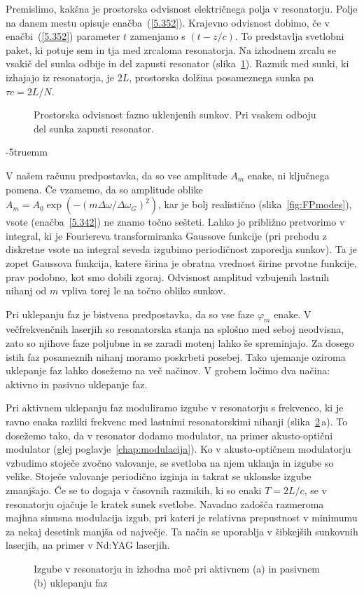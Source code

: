 Premislimo, kakšna je prostorska odvisnost električnega polja v
resonatorju. Polje na danem mestu opisuje enačba~(\ref{5.352}). Krajevno 
odvisnost dobimo, če v enačbi~(\ref{5.352}) parameter $t$ zamenjamo s $(t-z/c)$. To
predstavlja svetlobni paket, ki potuje sem in tja med zrcaloma
resonatorja. Na izhodnem zrcalu se vsakič del sunka odbije in del zapusti
resonator (slika~\ref{fig.5.11}). Razmik med sunki, ki izhajajo iz
resonatorja, je $2L$, prostorska dolžina posameznega sunka pa $\tau c=2L/N$.
\begin{figure}[h]
\centering
\def\svgwidth{120truemm} 

\caption{Prostorska odvisnost fazno uklenjenih sunkov. Pri vsakem odboju del
sunka zapusti resonator.}
\label{fig.5.11}
\end{figure}
\vglue-5truemm
\begin{remark}
V našem računu predpostavka, da so vse amplitude $A_{m}$ enake, ni ključnega 
pomena. Če vzamemo, da so amplitude oblike 
$A_{m}=A_{0}\exp (-(m\Delta \omega /\Delta \omega_{G})^{2})$, 
kar je bolj realistično (slika~\ref{fig:FPmodes}), vsote (enačba~\ref{5.342}) 
ne znamo točno sešteti. Lahko jo
približno pretvorimo v integral, ki je Fouriereva transformiranka Gaussove
funkcije (pri prehodu z diskretne vsote na integral seveda izgubimo
periodičnost zaporedja sunkov). Ta je zopet Gaussova funkcija, katere
širina je obratna vrednost širine prvotne funkcije, prav podobno, kot
smo dobili zgoraj. Odvisnost amplitud vzbujenih lastnih nihanj od $m$ 
vpliva torej le na točno obliko sunkov.
\end{remark}
\newpage
Pri uklepanju faz je bistvena predpostavka, da so vse faze $\varphi_m$ enake. 
V večfrekvenčnih laserjih so resonatorska stanja na splošno med seboj
neodvisna, zato so njihove faze poljubne in se zaradi motenj lahko še spreminjajo.
Za dosego istih faz posameznih nihanj moramo poskrbeti posebej. Tako ujemanje
oziroma uklepanje faz lahko dosežemo na več načinov. V grobem ločimo dva načina:
aktivno in pasivno uklepanje faz.

Pri aktivnem uklepanju faz moduliramo izgube v resonatorju
s frekvenco, ki je ravno enaka razliki 
frekvenc med lastnimi resonatorskimi nihanji (slika~\ref{fig:aktpas}\,a). 
To dosežemo tako, da v resonator dodamo
modulator, na primer akusto-optični modulator (glej poglavje~\ref{chap:modulacija}).
Ko v akusto-optičnem modulatorju vzbudimo stoječe zvočno valovanje, se 
svetloba na njem uklanja in izgube so velike. Stoječe valovanje periodično izginja
in takrat se uklonske izgube zmanjšajo. Če se to dogaja v časovnih
razmikih, ki so enaki $T=2L/c$, se v resonatorju ojačuje le kratek sunek svetlobe. 
Navadno zadošča razmeroma majhna sinusna modulacija izgub, pri kateri je relativna 
prepustnost v minimumu za nekaj desetink manjša od največje. Ta način se uporablja
v šibkejših sunkovnih laserjih, na primer v Nd:YAG laserjih.
\begin{figure}[h]
\centering
\def\svgwidth{80truemm} 

\caption{Izgube v resonatorju in izhodna moč pri aktivnem (a) in pasivnem (b) uklepanju faz}
\label{fig:aktpas}
\end{figure}

